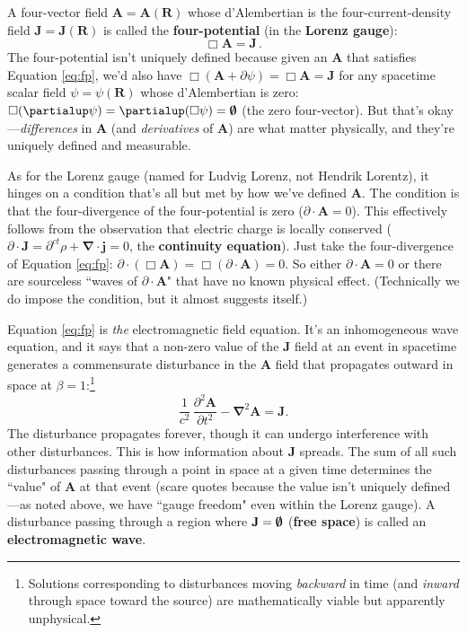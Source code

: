 \documentclass[12pt]{article}
\renewcommand{\vv}[1]{\mathbf{#1}}
\newcommand{\del}{\boldsymbol{\nabla}}
\begin{document}
A four-vector field $\vv A = \vv A (\vv R)$ whose d'Alembertian is the four-current-density field $\vv J = \vv J (\vv R)$ is called the \textbf{four-potential} (in the \textbf{Lorenz gauge}):
\begin{equation}\label{eq:fp}
\boxed{ \Box \vv A = \vv J } \, .
\end{equation}
The four-potential isn't uniquely defined because given an $\vv A$ that satisfies Equation \ref{eq:fp}, we'd also have $\Box (\vv A + \partialup \psi) = \Box \vv A = \vv J$ for any spacetime scalar field $\psi = \psi (\vv R)$ whose d'Alembertian is zero: ${\Box  (\partialup \psi) = \partialup (\Box \psi) = \textrm{\mbox{\boldmath $\emptyset$}}}$ (the zero four-vector). But that's okay---\emph{differences} in $\vv A$ (and \emph{derivatives} of $\vv A$) are what matter physically, and they're uniquely defined and measurable.

As for the Lorenz gauge (named for Ludvig Lorenz, not Hendrik Lorentz), it hinges on a condition that's all but met by how we've defined $\vv A$. The condition is that the four-divergence of the four-potential is zero (${\partialup \cdot \vv A = 0}$). This effectively follows from the observation that electric charge is locally conserved (${\partialup \cdot \vv J = \partial^{ct} \rho + \del \cdot \vv j = 0}$, the \textbf{continuity equation}). Just take the four-divergence of Equation \ref{eq:fp}: ${\partialup \cdot (\Box \vv A) = \Box ( \partialup \cdot \vv A) = 0}$. So either ${\partialup \cdot \vv A = 0}$ or there are sourceless ``waves of $\partialup \cdot \vv A$" that have no known physical effect. (Technically we do impose the condition, but it almost suggests itself.)

Equation \ref{eq:fp} is \emph{the} electromagnetic field equation. It's an inhomogeneous wave equation, and it says that a non-zero value of the $\vv J$ field at an event in spacetime generates a commensurate disturbance in the $\vv A$ field that propagates outward in space at $\beta = 1$:\footnote{Solutions corresponding to disturbances moving \emph{backward} in time (and \emph{inward} through space toward the source) are mathematically viable but apparently unphysical.}
\begin{equation*}
\dfrac{1}{c^2} \, \dfrac{\partial^2 \vv A}{\partial t^2} - \del^2 \vv A = \vv J .
\end{equation*}
The disturbance propagates forever, though it can undergo interference with other disturbances. This is how information about $\vv J$ spreads. The sum of all such disturbances passing through a point in space at a given time determines the ``value" of $\vv A$ at that event (scare quotes because the value isn't uniquely defined---as noted above, we have ``gauge freedom" even within the Lorenz gauge). A disturbance passing through a region where $\vv J = \textrm{\mbox{\boldmath $\emptyset$}}$ (\textbf{free space}) is called an \textbf{electromagnetic wave}.
\end{document}
